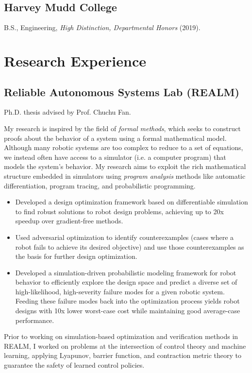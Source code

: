 \documentclass{cv_style}
\begin{document}
    \subsection{Harvey Mudd College}
            \begin{description}
                \item B.S., Engineering, \textit{High Distinction, Departmental Honors} (2019).
            \end{description}

\section{Research Experience}
\subsection{Reliable Autonomous Systems Lab (REALM)}
\begin{trivlist}
    \item Ph.D. thesis advised by Prof. Chuchu Fan.
    \item My research is inspired by the field of \textit{formal methods}, which seeks to construct proofs about the behavior of a system using a formal mathematical model. Although many robotic systems are too complex to reduce to a set of equations, we instead often have access to a simulator (i.e. a computer program) that models the system's behavior. My research aims to exploit the rich mathematical structure embedded in simulators using \textit{program analysis} methods like automatic differentiation, program tracing, and probabilistic programming.
    \begin{itemize}
        \item Developed a design optimization framework based on differentiable simulation to find robust solutions to robot design problems, achieving up to 20x speedup over gradient-free methods.
        \item Used adversarial optimization to identify counterexamples (cases where a robot fails to achieve its desired objective) and use those counterexamples as the basis for further design optimization.
        \item Developed a simulation-driven probabilistic modeling framework for robot behavior to efficiently explore the design space and predict a diverse set of high-likelihood, high-severity failure modes for a given robotic system. Feeding these failure modes back into the optimization process yields robot designs with 10x lower worst-case cost while maintaining good average-case performance.
    \end{itemize}

    \item Prior to working on simulation-based optimization and verification methods in REALM, I worked on problems at the intersection of control theory and machine learning, applying Lyapunov, barrier function, and contraction metric theory to guarantee the safety of learned control policies.
\end{trivlist}
\end{document}
